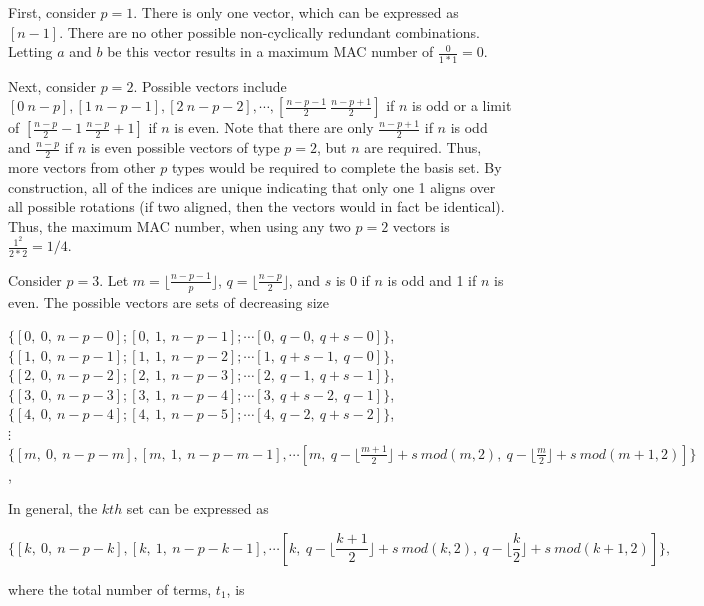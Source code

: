 \documentclass[3p,times]{elsarticle}
\begin{document}
First, consider $p=1$.  
There is only one vector, which can be expressed as $\left[n-1\right]$.  
There are no other possible non-cyclically redundant combinations.  
Letting $a$ and $b$ be this vector results in a maximum MAC number of $\frac{0}{1*1}=0$.

Next, consider $p=2$.  
Possible vectors include $[0\ n-p], [1\  n-p-1], [2\ n-p-2], \cdots, [\frac{n-p-1}{2}\ \frac{n-p+1}{2}]$ if $n$ is odd or a limit of $[\frac{n-p}{2}-1\ \frac{n-p}{2}+1]$ if $n$ is even. 
Note that there are only $\frac{n-p+1}{2}$ if $n$ is odd and $\frac{n-p}{2}$ if $n$ is even possible vectors of type $p=2$, but $n$ are required.  
Thus, more vectors from other $p$ types would be required to complete the basis set.  
By construction, all of the indices are unique indicating that only one 1 aligns over all possible rotations (if two aligned, then the vectors would in fact be identical). 
Thus, the maximum MAC number, when using any two $p=2$ vectors is $\frac{1^2}{2*2}=1/4$.

Consider $p=3$.  
Let $m=\lfloor\frac{n-p-1}{p}\rfloor$, $q=\lfloor\frac{n-p}{2}\rfloor$, and $s$ is 0 if $n$ is odd and 1 if $n$ is even. 
The possible vectors are sets of decreasing size

\begin{center}
$\{[0,\ 0,\ n-p-0]; [0,\ 1,\ n-p-1]; \cdots [0,\ q-0,\ q+s-0]\}$,\\
$\{[1,\ 0,\ n-p-1]; [1,\ 1,\ n-p-2]; \cdots [1,\ q+s-1,\ q-0]\}$,\\
$\{[2,\ 0,\ n-p-2]; [2,\ 1,\ n-p-3]; \cdots [2,\ q-1,\ q+s-1]\}$,\\
$\{[3,\ 0,\ n-p-3]; [3,\ 1,\ n-p-4]; \cdots [3,\ q+s-2,\ q-1]\}$,\\
$\{[4,\ 0,\ n-p-4]; [4,\ 1,\ n-p-5]; \cdots [4,\ q-2,\ q+s-2]\}$,\\
$\vdots$ \\
$\{[m,\ 0,\ n-p-m], [m,\ 1,\ n-p-m-1], \cdots [m,\ q-\lfloor \frac{m+1}{2}\rfloor+s\ mod(m,2),\ q-\lfloor \frac{m}{2}\rfloor+s\ mod(m+1,2)]\}$,
\end{center}

In general, the $kth$ set can be expressed as 

\begin{equation}
\{[k,\ 0,\ n-p-k], [k,\ 1,\ n-p-k-1], \cdots [k,\ q-\lfloor \frac{k+1}{2}\rfloor+s\ mod(k,2),\ q-\lfloor \frac{k}{2}\rfloor+s\ mod(k+1,2)]\},
\end{equation}

where the total number of terms, $t_1$, is
\end{document}
